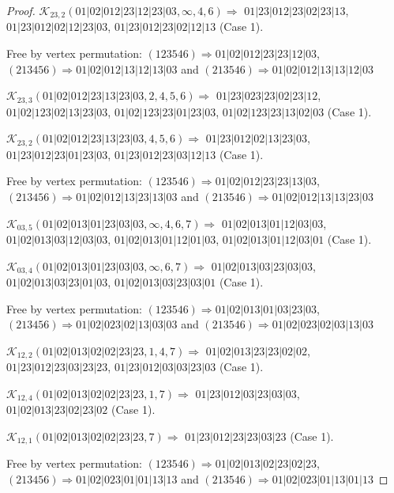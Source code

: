\documentclass[12pt]{article}
\theoremstyle{plain}
\theoremstyle{definition}
\theoremstyle{remark}
\newcommand{\fancy}[1]{\mathcal{#1}}
\def\K{\fancy{K}}
\begin{document}
\begin{proof}
	$\K_{23,2}(01|02|012|23|12|23|03,\infty,4, 6)\Rightarrow $ $01|23|012|23|02|23|13$, $01|23|012|02|12|23|03$, $01|23|012|23|02|12|13$ (Case 1).
	
	
	
	Free by vertex permutation: $(1 2 3 5 4 6)\Rightarrow 01|02|012|23|23|12|03$, $(2 1 3 4 5 6)\Rightarrow 01|02|012|13|12|13|03$ and $(2 1 3 5 4 6)\Rightarrow 01|02|012|13|13|12|03$
	
	
	
	\bigskip
	
	$\K_{23,3}(01|02|012|23|13|23|03,2, 4, 5, 6)\Rightarrow $ $01|23|023|23|02|23|12$, $01|02|123|02|13|23|03$, $01|02|123|23|01|23|03$, $01|02|123|23|13|02|03$ (Case 1).
	
	$\K_{23,2}(01|02|012|23|13|23|03,4, 5, 6)\Rightarrow $ $01|23|012|02|13|23|03$, $01|23|012|23|01|23|03$, $01|23|012|23|03|12|13$ (Case 1).
	
	
	
	Free by vertex permutation: $(1 2 3 5 4 6)\Rightarrow 01|02|012|23|23|13|03$, $(2 1 3 4 5 6)\Rightarrow 01|02|012|13|23|13|03$ and $(2 1 3 5 4 6)\Rightarrow 01|02|012|13|13|23|03$
	
	
	
	\bigskip
	
	$\K_{03,5}(01|02|013|01|23|03|03,\infty,4, 6, 7)\Rightarrow $ $01|02|013|01|12|03|03$, $01|02|013|03|12|03|03$, $01|02|013|01|12|01|03$, $01|02|013|01|12|03|01$ (Case 1).
	
	$\K_{03,4}(01|02|013|01|23|03|03,\infty,6, 7)\Rightarrow $ $01|02|013|03|23|03|03$, $01|02|013|03|23|01|03$, $01|02|013|03|23|03|01$ (Case 1).
	
	
	
	Free by vertex permutation: $(1 2 3 5 4 6)\Rightarrow 01|02|013|01|03|23|03$, $(2 1 3 4 5 6)\Rightarrow 01|02|023|02|13|03|03$ and $(2 1 3 5 4 6)\Rightarrow 01|02|023|02|03|13|03$
	
	
	
	\bigskip
	
	$\K_{12,2}(01|02|013|02|02|23|23,1, 4, 7)\Rightarrow $ $01|02|013|23|23|02|02$, $01|23|012|23|03|23|23$, $01|23|012|03|03|23|03$ (Case 1).
	
	$\K_{12,4}(01|02|013|02|02|23|23,1, 7)\Rightarrow $ $01|23|012|03|23|03|03$, $01|02|013|23|02|23|02$ (Case 1).
	
	$\K_{12,1}(01|02|013|02|02|23|23,7)\Rightarrow $ $01|23|012|23|23|03|23$ (Case 1).
	
	
	
	Free by vertex permutation: $(1 2 3 5 4 6)\Rightarrow 01|02|013|02|23|02|23$, $(2 1 3 4 5 6)\Rightarrow 01|02|023|01|01|13|13$ and $(2 1 3 5 4 6)\Rightarrow 01|02|023|01|13|01|13$
	

\end{proof}
\end{document}
